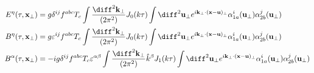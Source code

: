 \begin{align}
	E^\eta (\tau,\mathbf{x}_\perp) & = g \delta^{ij} f^{abc} T_c \int  \frac{\diff^2 \mathbf{k}_\perp}{(2\pi^2)} J_0 (k \tau) \int \diff^2 \mathbf{u}_\perp e^{i \mathbf{k}_\perp \cdot (\mathbf{x} - \mathbf{u})_\perp} \alpha^i_{1a} (\mathbf{u}_\perp) \alpha^j_{2b}(\mathbf{u}_\perp) \\
	B^\eta (\tau,\mathbf{x}_\perp) & = g \varepsilon^{ij} f^{abc} T_c \int  \frac{\diff^2 \mathbf{k}_\perp}{(2\pi^2)} J_0 (k \tau) \int \diff^2 \mathbf{u}_\perp e^{i \mathbf{k}_\perp \cdot (\mathbf{x} - \mathbf{u})_\perp} \alpha^i_{1a} (\mathbf{u}_\perp) \alpha^j_{2b}(\mathbf{u}_\perp) \\
	B^\alpha (\tau,\mathbf{x}_\perp) & = -ig \delta^{ij} f^{abc} T_c \varepsilon^{\alpha \beta} \int  \frac{\diff^2 \mathbf{k}_\perp}{(2\pi^2)} \hat{k}^\beta J_1 (k \tau) \int \diff^2 \mathbf{u}_\perp e^{i \mathbf{k}_\perp \cdot (\mathbf{x} - \mathbf{u})_\perp} \alpha^i_{1a} (\mathbf{u}_\perp) \alpha^j_{2b}(\mathbf{u}_\perp) 
\end{align}
